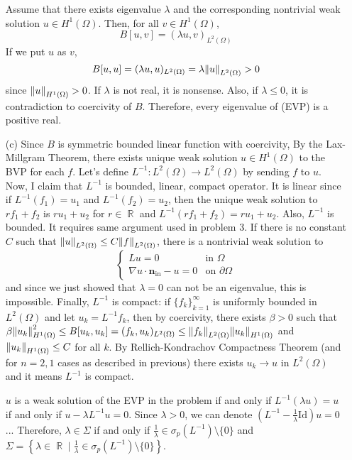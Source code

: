 \documentclass{article}
\DeclareMathOperator{\rr}{\mathbb{R}}
\begin{document}
\begin{enumerate}
Assume that there exists eigenvalue $\lambda$ and the corresponding nontrivial weak solution $u\in H^1(\Omega)$. Then, for all $v\in H^1(\Omega)$,
\begin{equation*}
B[u,v]=(\lambda u, v)_{L^2(\Omega)}
\end{equation*}
If we put $u$ as $v$,
\begin{equation*}
B[u,u]=(\lambda u, u)_{L^2(\Omega)}=\lambda\norm{u}_{L^2(\Omega)}>0
\end{equation*}
since $\norm{u}_{H^1(\Omega)}>0$. If $\lambda$ is not real, it is nonsense. Also, if $\lambda\leq 0$, it is contradiction to coercivity of $B$. Therefore, every eigenvalue of (EVP) is a positive real.
\item[(c)] Since $B$ is symmetric bounded linear function with coercivity, By the Lax-Millgram Theorem, there exists unique weak solution $u\in H^1(\Omega)$ to the BVP for each $f$. Let's define $L^{-1}:L^2(\Omega)\rightarrow L^2(\Omega)$ by sending $f$ to $u$. Now, I claim that $L^{-1}$ is bounded, linear, compact operator. It is linear since if $L^{-1}(f_1)=u_1$ and $L^{-1}(f_2)=u_2$, then the unique weak solution to $rf_1+f_2$ is $ru_1+u_2$ for $r\in \rr$ and $L^{-1}(rf_1+f_2)=ru_1+u_2$. Also, $L^{-1}$ is bounded. It requires same argument used in problem 3. If there is no constant $C$ such that $\norm{u}_{L^2(\Omega)}\leq C\norm{f}_{L^2(\Omega)}$, there is a nontrivial weak solution to
\begin{equation*}
\begin{cases}
Lu=0 & \text{in }\Omega\\
\nabla u\cdot \bm{n}_{\text{in}}-u=0 & \text{on }\partial \Omega
\end{cases}
\end{equation*}
and since we just showed that $\lambda=0$ can not be an eigenvalue, this is impossible. Finally, $L^{-1}$ is compact: if $\{f_k\}_{k=1}^\infty$ is uniformly bounded in $L^2(\Omega)$ and let $u_k=L^{-1}f_k$, then by coercivity, there exists $\beta>0$ such that $\beta\norm{u_k}^2_{H^1(\Omega)} \leq B[u_k,u_k]=(f_k,u_k)_{L^2(\Omega)}\leq \norm{f_k}_{L^2(\Omega)}\norm{u_k}_{H^1(\Omega)}$ and $\norm{u_k}_{H^1(\Omega)}\leq C$ for all $k$. By Rellich-Kondrachov Compactness Theorem (and for $n=2,1$ cases as described in previous) there exists $u_k\rightarrow u $ in $L^2(\Omega)$ and it means $L^{-1}$ is compact.


$u$ is a weak solution of the EVP in the problem if and only if $L^{-1}(\lambda u)=u$ if and only if $u-\lambda L^{-1}u=0$. Since $\lambda>0$, we can denote $\left(L^{-1}-\frac{1}{\lambda}\text{Id}\right)u=0$... Therefore, $\lambda\in \Sigma$ if and only if $\frac{1}{\lambda}\in \sigma_p(L^{-1})\setminus\{0\}$ and $\Sigma=\left\{\lambda\in \rr\mid \frac{1}{\lambda}\in \sigma_p\left(L^{-1}\right)\setminus\{0\}\right\}$.


\end{enumerate}
\end{document}
